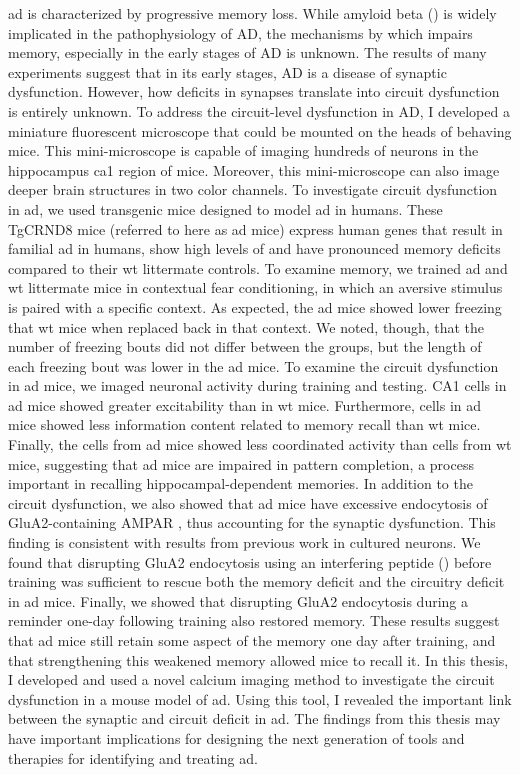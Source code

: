 \Gls{ad} is characterized by progressive memory loss. While amyloid beta (\abeta{}) is widely implicated in the pathophysiology of AD, the mechanisms by which \abeta{} impairs memory, especially in the early stages of AD is unknown. The results of many experiments suggest that in its early stages, AD is a disease of synaptic dysfunction. However, how deficits in synapses translate into circuit dysfunction is entirely unknown. To address the circuit-level dysfunction in AD, I developed a miniature fluorescent microscope that could be mounted on the heads of behaving mice. This mini-microscope is capable of imaging hundreds of neurons in the hippocampus \gls{ca1} region of mice. Moreover, this mini-microscope can also image deeper brain structures in two color channels. 
To investigate circuit dysfunction in \gls{ad}, we used transgenic mice designed to model \gls{ad} in humans. These TgCRND8 mice (referred to here as \gls{ad} mice) express human genes that result in familial \gls{ad} in humans, show high levels of \abeta{} and have pronounced memory deficits compared to their \gls{wt} littermate controls. To examine memory, we trained \gls{ad} and \gls{wt} littermate mice in contextual fear conditioning, in which an aversive stimulus is paired with a specific context. As expected, the \gls{ad} mice showed lower freezing that \gls{wt} mice when replaced back in that context. We noted, though, that the number of freezing bouts did not differ between the groups, but the length of each freezing bout was lower in the \gls{ad} mice. To examine the circuit dysfunction in \gls{ad} mice, we imaged neuronal activity during training and testing. CA1 cells in \gls{ad} mice showed greater excitability than in \gls{wt} mice. Furthermore, cells in \gls{ad} mice showed less information content related to memory recall than \gls{wt} mice. Finally, the cells from \gls{ad} mice showed less coordinated activity than cells from \gls{wt} mice, suggesting that \gls{ad} mice are impaired in pattern completion, a process important in recalling hippocampal-dependent memories.
In addition to the circuit dysfunction, we also showed that \gls{ad} mice have excessive endocytosis of GluA2-containing AMPAR , thus accounting for the synaptic dysfunction. This finding is consistent with results from previous work in cultured neurons. We found that disrupting GluA2 endocytosis using an interfering peptide (\tglu{}) before training was sufficient to rescue both the memory deficit and the circuitry deficit in \gls{ad} mice. Finally, we showed that disrupting GluA2 endocytosis during a reminder one-day following training also restored memory. These results suggest that \gls{ad} mice still retain some aspect of the memory one day after training, and that strengthening this weakened memory allowed mice to recall it.
In this thesis, I developed and used a novel calcium imaging method to investigate the circuit dysfunction in a mouse model of \gls{ad}. Using this tool, I revealed the important link between the synaptic and circuit deficit in \gls{ad}. The findings from this thesis may have important implications for designing the next generation of tools and therapies for identifying and treating \gls{ad}.
